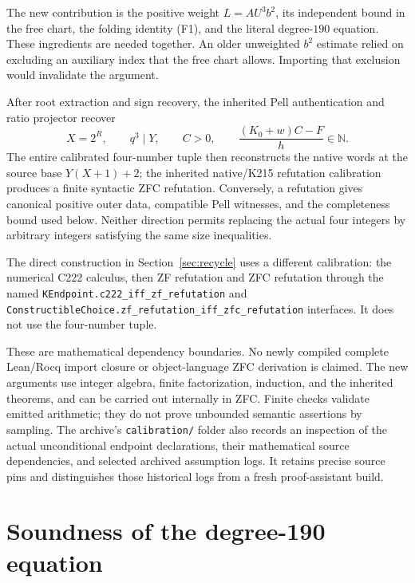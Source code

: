\documentclass[11pt]{article}
\theoremstyle{remark}
\newcommand{\N}{\mathbb N}
\begin{document}
The new contribution is the positive weight \(L=AU^3b^2\), its independent
bound in the free chart, the folding identity (F1), and the literal
degree-\(190\) equation. These ingredients are needed together.
An older unweighted \(b^2\) estimate relied on excluding an auxiliary index
that the free chart allows. Importing that exclusion would invalidate
the argument.

After root extraction and sign recovery, the inherited Pell authentication
and ratio projector recover
\[
 X=2^R,\qquad q^3\mid Y,\qquad C>0,\qquad
 \frac{(K_0+w)C-F}{h}\in\N.
 \tag{N}
\]
The entire calibrated four-number tuple then reconstructs the native
words at the source base \(Y(X+1)+2\); the inherited native/K215 refutation
calibration produces a finite syntactic ZFC refutation.
Conversely, a refutation gives canonical positive outer data, compatible
Pell witnesses, and the completeness bound used below.
Neither direction permits replacing the actual four integers by arbitrary
integers satisfying the same size inequalities.

The direct construction in Section~\ref{sec:recycle} uses a different
calibration: the numerical C222 calculus, then ZF refutation and ZFC
refutation through the named
\texttt{KEndpoint.c222\_iff\_zf\_refutation} and
\texttt{ConstructibleChoice.zf\_refutation\_iff\_zfc\_refutation}
interfaces. It does not use the four-number tuple.

These are mathematical dependency boundaries. No newly compiled complete
Lean/Rocq import closure or object-language ZFC derivation is claimed.
The new arguments use integer algebra, finite factorization, induction,
and the inherited theorems, and can be carried out internally in ZFC.
Finite checks validate emitted arithmetic; they do not prove unbounded
semantic assertions by sampling. The archive's \texttt{calibration/} folder
also records an inspection of the actual unconditional endpoint declarations,
their mathematical source dependencies, and selected archived assumption logs.
It retains precise source pins and distinguishes those historical logs from
a fresh proof-assistant build.

\section{Soundness of the degree-190 equation}
\end{document}
